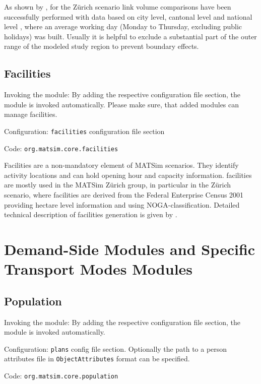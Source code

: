 As shown by \citet[][]{BalmerEtAl_ResRep_bdktzrh_2009}, for the Zürich scenario link volume comparisons have been successfully performed with data based on city level, cantonal level and national level \citep[][]{ASTRA_Webpage_2006}, where an average working day (Monday to Thursday, excluding public holidays) was built. Usually it is helpful to exclude a substantial part of the outer range of the modeled study region to prevent boundary effects.

\subsection{Facilities}
\label{sec:facilities}
\begin{compactitem}
\item Invoking the module: By adding the respective configuration file section, the module is invoked automatically. Please make sure, that added modules can manage facilities.
\item Configuration: \lstinline|facilities| configuration file section
\item Code: \lstinline|org.matsim.core.facilities|
\end{compactitem}

Facilities are a non-mandatory element of MATSim scenarios. They identify activity locations and can hold opening hour and capacity information. facilities are mostly used in the MATSim Zürich group, in particular in the Zürich scenario, where facilities are derived from the Federal Enterprise Census 2001 \citep[][]{SwissEnterpriseCensus_manual_2001} providing hectare level information and using NOGA-classification. Detailed technical description of facilities generation is given by \citet[][]{Meister_TechRep_IVT_2008, Meister_unpub_IVT_2007}.


\section{Demand-Side Modules and Specific Transport Modes Modules}
\label{sec:dsm}

\subsection{Population}
\label{sec:population}
\begin{compactitem}
\item Invoking the module: By adding the respective configuration file section, the module is invoked automatically.
\item Configuration: \lstinline|plans| config file section. Optionally the path to a person attributes file in \lstinline|ObjectAttributes| format can be specified.
\item Code: \lstinline|org.matsim.core.population|
\end{compactitem}

